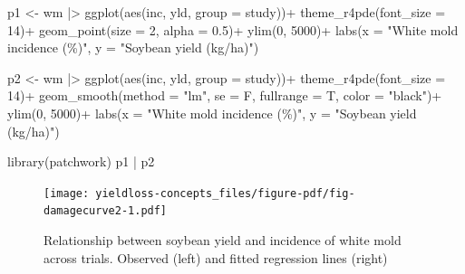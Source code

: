 \documentclass[
  letterpaper,
]{book}
\newenvironment{Shaded}{\begin{snugshade}}{\end{snugshade}}
\newcommand{\AttributeTok}[1]{\textcolor[rgb]{0.40,0.45,0.13}{#1}}
\newcommand{\DecValTok}[1]{\textcolor[rgb]{0.68,0.00,0.00}{#1}}
\newcommand{\FloatTok}[1]{\textcolor[rgb]{0.68,0.00,0.00}{#1}}
\newcommand{\FunctionTok}[1]{\textcolor[rgb]{0.28,0.35,0.67}{#1}}
\newcommand{\NormalTok}[1]{\textcolor[rgb]{0.00,0.23,0.31}{#1}}
\newcommand{\OtherTok}[1]{\textcolor[rgb]{0.00,0.23,0.31}{#1}}
\newcommand{\SpecialCharTok}[1]{\textcolor[rgb]{0.37,0.37,0.37}{#1}}
\newcommand{\StringTok}[1]{\textcolor[rgb]{0.13,0.47,0.30}{#1}}
\begin{document}
\begin{Shaded}
\begin{Highlighting}[]
\NormalTok{p1 }\OtherTok{\textless{}{-}}\NormalTok{ wm }\SpecialCharTok{|\textgreater{}} 
  \FunctionTok{ggplot}\NormalTok{(}\FunctionTok{aes}\NormalTok{(inc, yld, }\AttributeTok{group =}\NormalTok{ study))}\SpecialCharTok{+}
  \FunctionTok{theme\_r4pde}\NormalTok{(}\AttributeTok{font\_size =} \DecValTok{14}\NormalTok{)}\SpecialCharTok{+}
  \FunctionTok{geom\_point}\NormalTok{(}\AttributeTok{size =} \DecValTok{2}\NormalTok{, }\AttributeTok{alpha =} \FloatTok{0.5}\NormalTok{)}\SpecialCharTok{+}
  \FunctionTok{ylim}\NormalTok{(}\DecValTok{0}\NormalTok{, }\DecValTok{5000}\NormalTok{)}\SpecialCharTok{+}
  \FunctionTok{labs}\NormalTok{(}\AttributeTok{x =} \StringTok{"White mold incidence (\%)"}\NormalTok{,}
       \AttributeTok{y =} \StringTok{"Soybean yield (kg/ha)"}\NormalTok{)}

\NormalTok{p2 }\OtherTok{\textless{}{-}}\NormalTok{ wm }\SpecialCharTok{|\textgreater{}} 
  \FunctionTok{ggplot}\NormalTok{(}\FunctionTok{aes}\NormalTok{(inc, yld, }\AttributeTok{group =}\NormalTok{ study))}\SpecialCharTok{+}
  \FunctionTok{theme\_r4pde}\NormalTok{(}\AttributeTok{font\_size =} \DecValTok{14}\NormalTok{)}\SpecialCharTok{+}
  \FunctionTok{geom\_smooth}\NormalTok{(}\AttributeTok{method =} \StringTok{"lm"}\NormalTok{, }\AttributeTok{se =}\NormalTok{ F, }\AttributeTok{fullrange =}\NormalTok{ T, }\AttributeTok{color =} \StringTok{"black"}\NormalTok{)}\SpecialCharTok{+}
  \FunctionTok{ylim}\NormalTok{(}\DecValTok{0}\NormalTok{, }\DecValTok{5000}\NormalTok{)}\SpecialCharTok{+}
  \FunctionTok{labs}\NormalTok{(}\AttributeTok{x =} \StringTok{"White mold incidence (\%)"}\NormalTok{,}
       \AttributeTok{y =} \StringTok{"Soybean yield (kg/ha)"}\NormalTok{)}

\FunctionTok{library}\NormalTok{(patchwork)}
\NormalTok{p1 }\SpecialCharTok{|}\NormalTok{ p2}
\end{Highlighting}
\end{Shaded}

\begin{figure}[H]

{\centering \texttt{[image: yieldloss-concepts\_files/figure-pdf/fig-damagecurve2-1.pdf]}

}

\caption{\label{fig-damagecurve2}Relationship between soybean yield and
incidence of white mold across trials. Observed (left) and fitted
regression lines (right)}

\end{figure}
\end{document}

